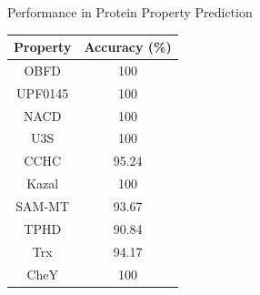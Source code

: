 \documentclass[dvipsnames]{beamer}
\begin{document}
\begin{frame}{Performance in Protein Property Prediction}
	\begin{center}
		\begin{tabular}{cc}\hline
			Property & Accuracy (\%) \\\hline
			OBFD     & 100 \\
			UPF0145  & 100 \\
			NACD     & 100 \\
			U3S      & 100 \\
			CCHC     & 95.24  \\
			Kazal    & 100 \\
			SAM-MT   & 93.67  \\
			TPHD     & 90.84  \\
			Trx      & 94.17  \\
			CheY     & 100 \\\hline
		\end{tabular}
	\end{center}
\end{frame}
\end{document}
